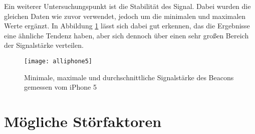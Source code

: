 Ein weiterer Untersuchungspunkt ist die Stabilität des Signal. Dabei wurden die gleichen Daten wie zuvor verwendet, jedoch um die minimalen und maximalen Werte ergänzt. In Abbildung \ref{all-iphone5} lässt sich dabei gut erkennen, das die Ergebnisse eine ähnliche Tendenz haben, aber sich dennoch über einen sehr großen Bereich der Signalstärke verteilen.

\begin{figure}[htb!]
		\centering
	\texttt{[image: alliphone5]}
	\caption{Minimale, maximale und durchschnittliche Signalstärke des Beacons gemessen vom iPhone 5}
	\label{all-iphone5}
\end{figure}





\section{Mögliche Störfaktoren}
\label{sec:dataandmeasurement:interferencefactor}
